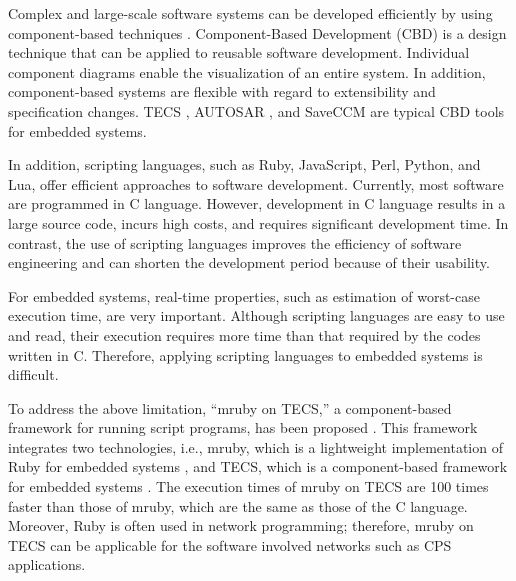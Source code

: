 \documentclass[conference]{IEEEtran/IEEEtran/IEEEtran}
\begin{document}
Complex and large-scale software systems can be developed efficiently by using component-based techniques \cite{par:Crnkovic}.
Component-Based Development (CBD) is a design technique that can be applied to reusable software development.
Individual component diagrams enable the visualization of an entire system.
In addition, component-based systems are flexible with regard to extensibility and specification changes.
TECS \cite{par:TECS}, AUTOSAR \cite{url:AUTOSAR}, and SaveCCM \cite{par:SAVEapproach} are typical CBD tools for embedded systems.

In addition, scripting languages, such as Ruby, JavaScript, Perl, Python, and Lua, offer efficient approaches to software development.
Currently, most software are programmed in C language.
However, development in C language results in a large source code, incurs high costs, and requires significant development time.
In contrast, the use of scripting languages improves the efficiency of software engineering and can shorten the development period because of their usability. 

For embedded systems, real-time properties, such as estimation of worst-case execution time, are very important.
Although scripting languages are easy to use and read, their execution requires more time than that required by the codes written in C.
Therefore, applying scripting languages to embedded systems is difficult.

To address the above limitation, ``mruby on TECS,'' a component-based framework for running script programs, has been proposed \cite{par:mrubyonTECS}.
This framework integrates two technologies, i.e., mruby, which is a lightweight implementation of Ruby for embedded systems \cite{par:mruby}, and TECS, which is a component-based framework for embedded systems \cite{par:TECS}.
The execution times of mruby on TECS are 100 times faster than those of mruby, which are the same as those of the C language.
Moreover, Ruby is often used in network programming; therefore, mruby on TECS can be applicable for the software involved networks such as CPS applications.
\end{document}
